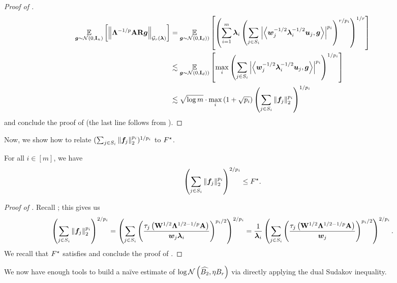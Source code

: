 \documentclass[11pt]{article}
\numberwithin{equation}{section}
\begin{document}
\begin{proof}[Proof of ]
\begin{align*}
    \underset{\bm{g}\sim\mathcal{N}(0,\mathbf{I}_n)}{\mathbb{E}}\left[\left\lVert \mathbf{\Lambda}^{-1/p}\mathbf{A}\mathbf{R}\bm{g} \right\rVert_{\mathcal{G}_{r}(\bm{\lambda})}\right] &= \underset{\bm{g}\sim\mathcal{N}(0,\mathbf{I}_d))}{\mathbb{E}}\left[\left(\sum_{i=1}^m \bm{\lambda}_i\left(\sum_{j \in S_i}\left\lvert \left\langle \bm{w}_j^{-1/2}\bm{\lambda}_i^{-1/2}\bm{u}_j,\bm{g} \right\rangle \right\rvert^{p_i}\right)^{r/p_i}\right)^{1/r}\right] \\
    &\lesssim \underset{\bm{g}\sim\mathcal{N}(0,\mathbf{I}_d))}{\mathbb{E}}\left[\max_i \left(\sum_{j \in S_i}\left\lvert \left\langle \bm{w}_j^{-1/2}\bm{\lambda}_i^{-1/2}\bm{u}_j,\bm{g} \right\rangle \right\rvert^{p_i}\right)^{1/p_i}\right] \\
    &\lesssim \sqrt{\log m} \cdot \max_i \left(1+\sqrt{p_i}\right)\left(\sum_{j \in S_i} \left\lVert \bm{f}_j \right\rVert_{2}^{p_i}\right)^{1/p_i}
\end{align*}
and conclude the proof of  (the last line follows from ).
\end{proof}

Now, we show how to relate $(\sum_{j \in S_i} \left\lVert \bm{f}_j \right\rVert_2^{p_i})^{1/p_i}$ to $F^{\star}$.

\begin{lemma}
\label{lemma:convert_f_to_fstar}
For all $i \in [m]$, we have
\begin{align*}
    \left(\sum_{j \in S_i} \left\lVert \bm{f}_j \right\rVert_2^{p_i}\right)^{2/p_i} \le F^{\star}.
\end{align*}
\end{lemma}
\begin{proof}[Proof of ]
Recall ; this gives us
\begin{align*}
    \left(\sum_{j \in S_i} \left\lVert \bm{f}_j \right\rVert_{2}^{p_i}\right)^{2/p_i} = \left(\sum_{j \in S_i} \left(\frac{\tau_j\left(\mathbf{W}^{1/2}\mathbf{\Lambda}^{1/2-1/p}\mathbf{A}\right)}{\bm{w}_j\bm{\lambda}_i}\right)^{p_i/2}\right)^{2/p_i} = \frac{1}{\bm{\lambda}_i}\left(\sum_{j \in S_i} \left(\frac{\tau_j\left(\mathbf{W}^{1/2}\mathbf{\Lambda}^{1/2-1/p}\mathbf{A}\right)}{\bm{w}_j}\right)^{p_i/2}\right)^{2/p_i}.
\end{align*}
We recall that $F^{\star}$ satisfies  and conclude the proof of .
\end{proof}

We now have enough tools to build a na\"ive estimate of $\log\mathcal{N}\left(\widehat{B_2},\eta B_r\right)$ via directly applying the dual Sudakov inequality.
\end{document}
